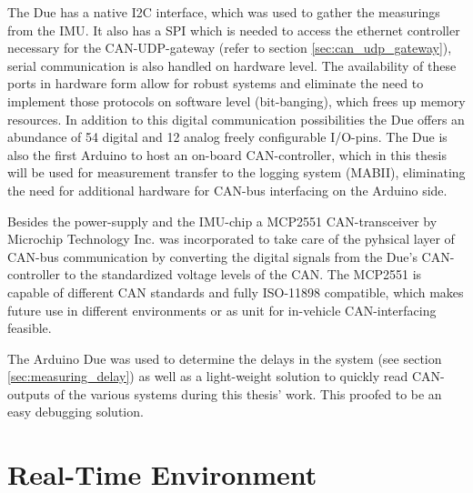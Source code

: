 \documentclass[ExampleMasters.tex]{subfiles}
\begin{document}
The Due has a native \gls{I2C} interface, which was used to gather the measurings from the \gls{IMU}. It also has a \gls{SPI} which is needed to access the ethernet controller necessary for the \gls{CAN}-\Gls{UDP}-gateway (refer to section \ref{sec:can_udp_gateway}), serial communication is also handled on hardware level. The availability of these ports in hardware form allow for robust systems and eliminate the need to implement those protocols on software level (bit-banging), which frees up memory resources. In addition to this digital communication possibilities the Due offers an abundance of 54 digital and 12 analog freely configurable I/O-pins. The Due is also the first Arduino to host an on-board \gls{CAN}-controller, which in this thesis will be used for measurement transfer to the logging system (\gls{MABII}), eliminating the need for additional hardware for \gls{CAN}-bus interfacing on the Arduino side.

Besides the power-supply and the \gls{IMU}-chip a MCP2551 CAN-transceiver by Microchip Technology Inc. was incorporated to take care of the pyhsical layer of CAN-bus communication by converting the digital signals from the Due's CAN-controller to the standardized voltage levels of the \gls{CAN}. The MCP2551 is capable of different \gls{CAN} standards and fully ISO-11898 compatible, which makes future use in different environments or as unit for in-vehicle CAN-interfacing feasible.

The Arduino Due was used to determine the delays in the system (see section \ref{sec:measuring_delay}) as well as a light-weight solution to quickly read \gls{CAN}-outputs of the various systems during this thesis' work. This proofed to be an easy debugging solution.


\section{Real-Time Environment}
\label{sec:realtime_environment}
\end{document}

